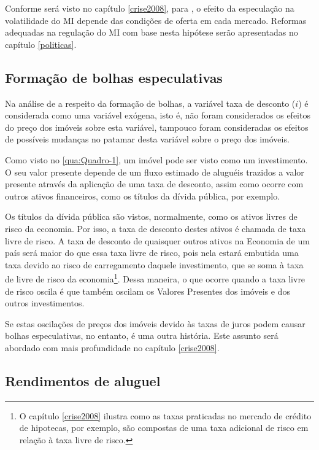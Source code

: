 \documentclass[
	12pt,				%
	oneside,			%
	a4paper,			%
	chapter=TITLE,		%
	section=TITLE,		%
	english,			%
	brazil				%
	]{abntex2}
\begin{document}
Conforme será visto no capítulo \ref{crise2008}, para \textcite[p.~26]{Malpezzi2002TheRO}, o
efeito da especulação na volatilidade do \gls{MI} depende das condições de
oferta em cada mercado. Reformas adequadas na regulação do \gls{MI} com base
nesta hipótese serão apresentadas no capítulo \ref{politicas}.

\hypertarget{formauxe7uxe3o-de-bolhas-especulativas}{%
\subsection{Formação de bolhas especulativas}\label{formauxe7uxe3o-de-bolhas-especulativas}}

Na análise de \textcite{Malpezzi2002TheRO} a respeito da formação de bolhas, a variável
taxa de desconto (\(i\)) é considerada como uma variável exógena, isto é, não
foram considerados os efeitos do preço dos imóveis sobre esta variável, tampouco
foram consideradas os efeitos de possíveis mudanças no patamar desta variável
sobre o preço dos imóveis.

Como visto no \ref{qua:Quadro-1}, um imóvel pode ser visto como um investimento.
O seu valor presente depende de um fluxo estimado de aluguéis trazidos a
valor presente através da aplicação de uma taxa de desconto, assim como ocorre
com outros ativos financeiros, como os títulos da dívida pública, por exemplo.

Os títulos da dívida pública são vistos, normalmente, como os ativos livres de
risco da economia. Por isso, a taxa de desconto destes ativos é chamada de taxa
livre de risco. A taxa de desconto de quaisquer outros ativos na Economia de um
país será maior do que essa taxa livre de risco, pois nela estará embutida uma
taxa devido ao risco de carregamento daquele investimento, que se soma à taxa de
livre de risco da economia\footnote{O capítulo \ref{crise2008} ilustra como as taxas praticadas no mercado de
  crédito de hipotecas, por exemplo, são compostas de uma taxa adicional de risco
  em relação à taxa livre de risco.}. Dessa maneira, o que ocorre quando a taxa livre
de risco oscila é que também oscilam os Valores Presentes dos imóveis e dos
outros investimentos.

Se estas oscilações de preços dos imóveis devido às taxas de juros podem causar
bolhas especulativas, no entanto, é uma outra história. Este assunto será abordado com mais profundidade no capítulo \ref{crise2008}.

\hypertarget{rendimentos-de-aluguel}{%
\subsection{Rendimentos de aluguel}\label{rendimentos-de-aluguel}}
\end{document}
